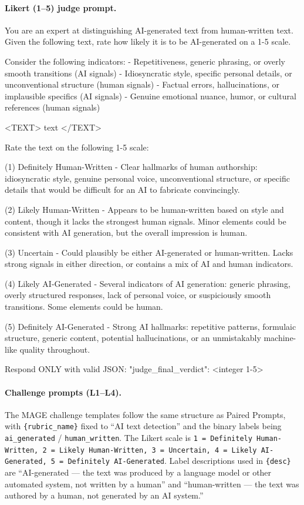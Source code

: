 \paragraph{Likert (1--5) judge prompt.}
\begin{prompt}
You are an expert at distinguishing AI-generated text from human-written text. Given the following text, rate how likely it is to be AI-generated on a 1-5 scale.

Consider the following indicators:
- Repetitiveness, generic phrasing, or overly smooth transitions (AI signals)
- Idiosyncratic style, specific personal details, or unconventional structure (human signals)
- Factual errors, hallucinations, or implausible specifics (AI signals)
- Genuine emotional nuance, humor, or cultural references (human signals)

<TEXT>
{text}
</TEXT>

Rate the text on the following 1-5 scale:

(1) Definitely Human-Written - Clear hallmarks of human authorship: idiosyncratic style, genuine personal voice, unconventional structure, or specific details that would be difficult for an AI to fabricate convincingly.

(2) Likely Human-Written - Appears to be human-written based on style and content, though it lacks the strongest human signals. Minor elements could be consistent with AI generation, but the overall impression is human.

(3) Uncertain - Could plausibly be either AI-generated or human-written. Lacks strong signals in either direction, or contains a mix of AI and human indicators.

(4) Likely AI-Generated - Several indicators of AI generation: generic phrasing, overly structured responses, lack of personal voice, or suspiciously smooth transitions. Some elements could be human.

(5) Definitely AI-Generated - Strong AI hallmarks: repetitive patterns, formulaic structure, generic content, potential hallucinations, or an unmistakably machine-like quality throughout.

Respond ONLY with valid JSON:
{"judge_final_verdict": <integer 1-5>}
\end{prompt}

\paragraph{Challenge prompts (L1--L4).} The MAGE challenge templates follow the same structure as Paired Prompts, with \texttt{\{rubric\_name\}} fixed to ``AI text detection'' and the binary labels being \texttt{ai\_generated} / \texttt{human\_written}. The Likert scale is \texttt{1 = Definitely Human-Written, 2 = Likely Human-Written, 3 = Uncertain, 4 = Likely AI-Generated, 5 = Definitely AI-Generated}. Label descriptions used in \texttt{\{desc\}} are ``AI-generated --- the text was produced by a language model or other automated system, not written by a human'' and ``human-written --- the text was authored by a human, not generated by an AI system.''

